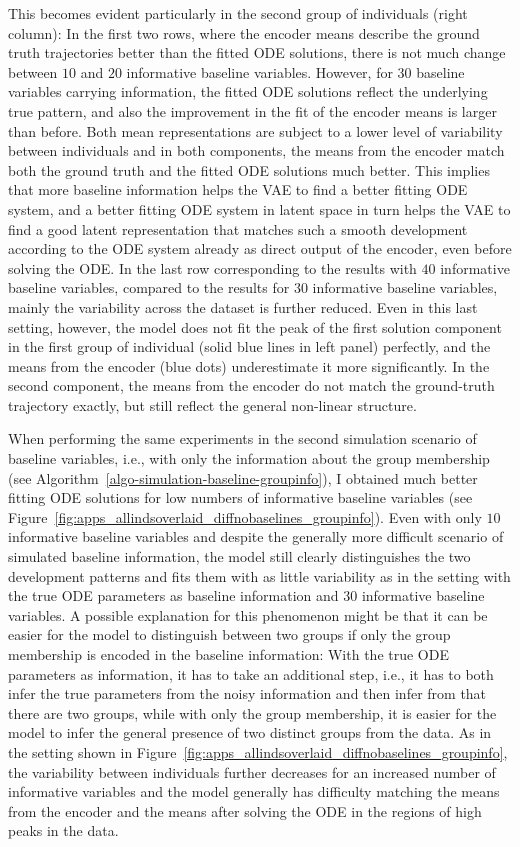 This becomes evident particularly in the second group of individuals (right column): In the first two rows, where the encoder means describe the ground truth trajectories better than the fitted ODE solutions, there is not much change between $10$ and $20$ informative baseline variables. However, for $30$ baseline variables carrying information, the fitted ODE solutions reflect the underlying true pattern, and also the improvement in the fit of the encoder means is larger than before. Both mean representations are subject to a lower level of variability between individuals and in both components, the means from the encoder match both the ground truth and the fitted ODE solutions much better. This implies that more baseline information helps the VAE to find a better fitting ODE system, and a better fitting ODE system in latent space in turn helps the VAE to find a good latent representation that matches such a smooth development according to the ODE system already as direct output of the encoder, even before solving the ODE. 
In the last row corresponding to the results with $40$ informative baseline variables, compared to the results for $30$ informative baseline variables, mainly the variability across the dataset is further reduced. Even in this last setting, however, the model does not fit the peak of the first solution component in the first group of individual (solid blue lines in left panel) perfectly, and the means from the encoder (blue dots) underestimate it more significantly. In the second component, the means from the encoder do not match the ground-truth trajectory exactly, but still reflect the general non-linear structure. 

When performing the same experiments in the second simulation scenario of baseline variables, i.e., with only the information about the group membership (see Algorithm~\ref{algo-simulation-baseline-groupinfo}), I obtained much better fitting ODE solutions for low numbers of informative baseline variables (see Figure~\ref{fig:apps_allindsoverlaid_diffnobaselines_groupinfo}). Even with only $10$ informative baseline variables and despite the generally more difficult scenario of simulated baseline information, the model still clearly distinguishes the two development patterns and fits them with as little variability as in the setting with the true ODE parameters as baseline information and $30$ informative baseline variables. 
A possible explanation for this phenomenon might be that it can be easier for the model to distinguish between two groups if only the group membership is encoded in the baseline information: With the true ODE parameters as information, it has to take an additional step, i.e., it has to both infer the true parameters from the noisy information and then infer from that there are two groups, while with only the group membership, it is easier for the model to infer the general presence of two distinct groups from the data. 
As in the setting shown in Figure~\ref{fig:apps_allindsoverlaid_diffnobaselines_groupinfo}, the variability between individuals further decreases for an increased number of informative variables and the model generally has difficulty matching the means from the encoder and the means after solving the ODE in the regions of high peaks in the data. 

